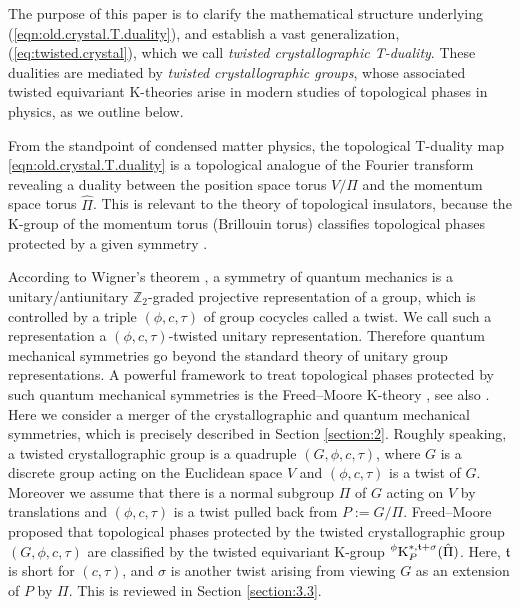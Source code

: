 \documentclass[11pt]{amsart}
\theoremstyle{definition}
\theoremstyle{plain}
\theoremstyle{remark}
\newcommand{\bZ}{\mathbb{Z}}
\newcommand{\ft}{\mathfrak{t}}
\newcommand{\K}{\mathrm{K}}%
\begin{document}
The purpose of this paper is to clarify the mathematical structure underlying (\ref{eqn:old.crystal.T.duality}), and establish a vast generalization, (\ref{eq:twisted.crystal}), which we call \emph{twisted crystallographic T-duality}. These dualities are mediated by \emph{twisted crystallographic groups}, whose associated twisted equivariant K-theories arise in modern studies of topological phases in physics, as we outline below.


From the standpoint of condensed matter physics, the topological T-duality map \eqref{eqn:old.crystal.T.duality} is a topological analogue of the Fourier transform revealing a duality between the position space torus $V/\Pi$ and the momentum space torus $\hat{\Pi}$.
This is relevant to the theory of topological insulators, because the K-group of the momentum torus (Brillouin torus) classifies topological phases protected by a given symmetry \cites{kitaevPeriodicTableTopological2009,schnyderClassificationTopologicalInsulators2008,freedTwistedEquivariantMatter2013}.


According to Wigner's theorem \cite{freedWignerTheorem2012}, a symmetry of quantum mechanics is a unitary/antiunitary $\bZ_2$-graded projective representation of a group, which is controlled by a triple $(\phi,c,\tau)$ of group cocycles called a twist. We call such a representation a $(\phi,c,\tau)$-twisted unitary representation. Therefore quantum mechanical symmetries go beyond the standard theory of unitary group representations. A powerful framework to treat topological phases protected by such quantum mechanical symmetries is the Freed--Moore K-theory \cite{freedTwistedEquivariantMatter2013}, see also \cites{thiangKtheoreticClassificationTopological2016,kubotaControlledTopologicalPhases2017,gomiFreedMooreKtheory2017}. 
Here we consider a merger of the crystallographic and quantum mechanical symmetries, which is precisely described in Section \ref{section:2}. Roughly speaking, a twisted crystallographic group is a quadruple $(G,\phi,c,\tau)$, where $G$ is a discrete group acting on the Euclidean space $V$ and $(\phi,c,\tau)$ is a twist of $G$. Moreover we assume that there is a normal subgroup $\Pi$ of $G$ acting on $V$ by translations and $(\phi,c,\tau)$ is a twist pulled back from $P:=G/\Pi$.
Freed--Moore~\cite{freedTwistedEquivariantMatter2013} proposed that topological phases protected by the twisted crystallographic group $(G,\phi,c,\tau)$ are classified by the twisted equivariant $\K$-group $\prescript{\phi}{}{\K}_P^{*,\ft + \sigma}(\hat{\Pi})$. Here, $\ft$ is short for $(c,\tau)$, and $\sigma$ is another twist arising from viewing $G$ as an extension of $P$ by $\Pi$. This is reviewed in Section \ref{section:3.3}.
\end{document}
